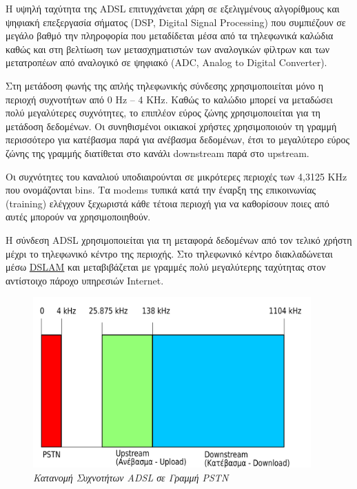  Η υψηλή ταχύτητα της ADSL επιτυγχάνεται χάρη σε εξελιγμένους αλγορίθμους και ψηφιακή επεξεργασία σήματος (DSP, Digital Signal Processing) που συμπιέζουν σε μεγάλο βαθμό την πληροφορία που μεταδίδεται μέσα από τα τηλεφωνικά καλώδια καθώς και στη βελτίωση των μετασχηματιστών των αναλογικών φίλτρων και των μετατροπέων από αναλογικό σε ψηφιακό (ADC, Analog to Digital Converter).
 
 Στη μετάδοση φωνής της απλής τηλεφωνικής σύνδεσης χρησιμοποιείται μόνο η περιοχή συχνοτήτων από 0 Hz -- 4 KHz. Καθώς το καλώδιο μπορεί να μεταδώσει πολύ μεγαλύτερες συχνότητες, το επιπλέον εύρος ζώνης χρησιμοποιείται για τη μετάδοση δεδομένων.  Οι συνηθισμένοι οικιακοί χρήστες χρησιμοποιούν τη γραμμή περισσότερο για κατέβασμα παρά για ανέβασμα δεδομένων, έτσι το μεγαλύτερο εύρος ζώνης της γραμμής διατίθεται στο κανάλι downstream παρά στο upstream.
 
 Οι συχνότητες του καναλιού υποδιαιρούνται σε μικρότερες περιοχές των 4,3125 KHz που ονομάζονται bins. Τα modems τυπικά κατά την έναρξη της επικοινωνίας (training) ελέγχουν ξεχωριστά κάθε τέτοια περιοχή για να καθορίσουν ποιες από αυτές μπορούν να χρησιμοποιηθούν. 
 
 Η σύνδεση ADSL χρησιμοποιείται για τη μεταφορά δεδομένων από τον τελικό χρήστη μέχρι το τηλεφωνικό κέντρο της περιοχής. Στο τηλεφωνικό κέντρο διακλαδώνεται μέσω \href{https://el.wikipedia.org/wiki/Digital_subscriber_line_access_multiplexer}{DSLAM} και μεταβιβάζεται με γραμμές πολύ μεγαλύτερης ταχύτητας στον αντίστοιχο πάροχο υπηρεσιών Internet.
 
 \begin{figure}[!ht]
  \centering
  \includegraphics[width=0.95\textwidth]{images/chapter5/5-3}
  \caption {\textsl{Κατανομή Συχνοτήτων ADSL σε Γραμμή PSTN}}
  \label{5-3}
\end{figure}

